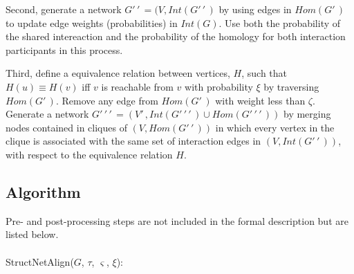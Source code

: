 \documentclass[12pt,twoside]{article}
\def\NI{\noindent}
\begin{document}
\NI Second, generate a network $G'\,\!'\,\! = (V, Int(G'\,\!'\,\!)$ by using edges in $Hom(G'\,\!)$ to update edge weights (probabilities) in $Int(G)$. Use both the probability of the shared intereaction and the probability of the homology for both interaction participants in this process.

\NI Third, define a equivalence relation between vertices, $H$, such that $H(u) \equiv H(v)$ iff $v$ is reachable from $v$ with probability $\xi$ by traversing $Hom(G'\,\!)$. Remove any edge from $Hom(G'\,\!)$ with weight less than $\zeta$. Generate a network $G'\,\!'\,\!'\,\! = (V'\,\!, Int(G'\,\!'\,\!'\,\!) \cup Hom(G'\,\!'\,\!'\,\!))$ by merging nodes contained in cliques of $(V,Hom(G'\,\!'\,\!))$ in which every vertex in the clique is associated with the same set of interaction edges in $(V, Int(G'\,\!'\,\!))$, with respect to the equivalence relation $H$.

\subsection{Algorithm}

Pre- and post-processing steps are not included in the formal description but are listed below.\\\\
StructNetAlign($G$, $\tau$, $\varsigma$, $\xi$):
\end{document}
